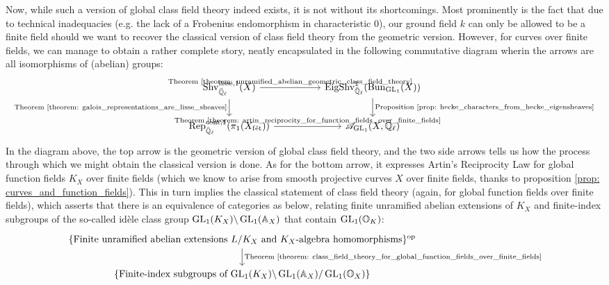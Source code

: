         Now, while such a version of global class field theory indeed exists, it is not without its shortcomings. Most prominently is the fact that due to technical inadequacies (e.g. the lack of a Frobenius endomorphism in characteristic $0$), our ground field $k$ can only be allowed to be a finite field should we want to recover the classical version of class field theory from the geometric version. However, for curves over finite fields, we can manage to obtain a rather complete story, neatly encapsulated in the following commutative diagram wherin the arrows are all isomorphisms of (abelian) groups:
            $$
                \begin{tikzcd}
                	{\Shv_{\bar{\Q}_{\ell}}^{\lisse, 1}(X)} && {\Eig\Shv_{\bar{\Q}_{\ell}}^1(\Bun_{\GL_1}(X))} \\
                	{\Rep^{\cont, 1}_{\bar{\Q}_{\ell}}(\pi_1(X_{\fet}))} && {\scrA_{\GL_1}(X, \bar{\Q}_{\ell})}
                	\arrow["{\text{Theorem \ref{theorem: unramified_abelian_geometric_class_field_theory}}}", from=1-1, to=1-3]
                	\arrow["{\text{Theorem \ref{theorem: galois_representations_are_lisse_sheaves}}}"', from=1-1, to=2-1]
                	\arrow["{{\text{Proposition \ref{prop: hecke_characters_from_hecke_eigensheaves}}}}", from=1-3, to=2-3]
                	\arrow["{\text{Theorem \ref{theorem: artin_reciprocity_for_function_fields_over_finite_fields}}}", from=2-1, to=2-3]
                \end{tikzcd}
            $$
        In the diagram above, the top arrow is the geometric version of global class field theory, and the two side arrows tells us how the  process through which we might obtain the classical version is done. As for the bottom arrow, it expresses Artin's Reciprocity Law for global function fields $K_X$ over finite fields (which we know to arise from smooth projective curves $X$ over finite fields, thanks to proposition \ref{prop: curves_and_function_fields}). This in turn implies the classical statement of class field theory (again, for global function fields over finite fields), which asserts that there is an equivalence of categories as below, relating finite unramified abelian extensions of $K_X$ and finite-index subgroups of the so-called id\`ele class group $\operatorname{GL}_1(K_X)\backslash\operatorname{GL}_1(\mathbb{A}_X)$ that contain $\operatorname{GL}_1(\mathbb{O}_K)$:
            $$
                \begin{tikzcd}
                	{\{\text{Finite unramified abelian extensions $L/K_X$ and $K_X$-algebra homomorphisms}\}^{\op}} \\
                	{\{\text{Finite-index subgroups of $\GL_1(K_X)\backslash\GL_1(\A_X)/\GL_1(\bbO_{X})$}\}}
                	\arrow["{\text{Theorem \ref{theorem: class_field_theory_for_global_function_fields_over_finite_fields}}}", from=1-1, to=2-1]
                \end{tikzcd}
            $$ 
